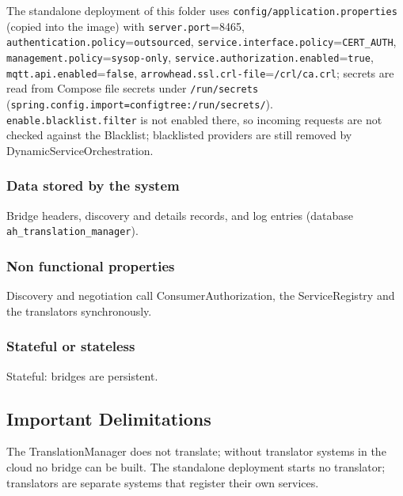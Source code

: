 \documentclass[a4paper]{arrowhead}
\begin{document}
The standalone deployment of this folder uses \texttt{config/\allowbreak{}application.\allowbreak{}properties} (copied into the image) with \texttt{server.\allowbreak{}port}=8465, \texttt{authentication.\allowbreak{}policy}=\texttt{outsourced}, \texttt{service.\allowbreak{}interface.\allowbreak{}policy}=\texttt{CERT\_AUTH}, \texttt{management.\allowbreak{}policy}=\texttt{sysop-\allowbreak{}only}, \texttt{service.\allowbreak{}authorization.\allowbreak{}enabled}=\texttt{true}, \texttt{mqtt.\allowbreak{}api.\allowbreak{}enabled}=\texttt{false}, \texttt{arrowhead.\allowbreak{}ssl.\allowbreak{}crl-\allowbreak{}file}=\texttt{/\allowbreak{}crl/\allowbreak{}ca.\allowbreak{}crl}; secrets are read from Compose file secrets under \texttt{/\allowbreak{}run/\allowbreak{}secrets} (\texttt{spring.\allowbreak{}config.\allowbreak{}import=\allowbreak{}configtree:\allowbreak{}/\allowbreak{}run/\allowbreak{}secrets/}). \texttt{enable.\allowbreak{}blacklist.\allowbreak{}filter} is not enabled there, so incoming requests are not checked against the Blacklist; blacklisted providers are still removed by Dynamic\allowbreak{}Service\allowbreak{}Orchestration.

\subsubsection{Data stored by the system}

Bridge headers, discovery and details records, and log entries (database \texttt{ah\_\allowbreak{}translation\_\allowbreak{}manager}).

\subsubsection{Non functional properties}

Discovery and negotiation call Consumer\allowbreak{}Authorization, the ServiceRegistry and the translators synchronously.

\subsubsection{Stateful or stateless}

Stateful: bridges are persistent.

\subsection{Important Delimitations}
\label{sec:delimitations}

The Translation\allowbreak{}Manager does not translate; without translator systems in the cloud no bridge can be built. The standalone deployment starts no translator; translators are separate systems that register their own services.
\end{document}
